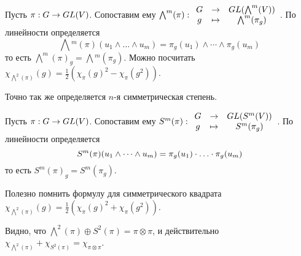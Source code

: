 {    Пусть $\pi: G \map GL(V)$. Сопоставим ему $\bigwedge^m(\pi): \arr{ccc}{G&\map&GL(\bigwedge^m(V))\\g&\mapsto&\bigwedge^m(\pi_g)}$.
    По линейности определяется \[\bigwedge\!\!{}^m(\pi)(u_1 \wedge \dots \wedge u_m) = \pi_g(u_1) \wedge \cdots \wedge \pi_g(u_m)\]
    то есть $\bigwedge^m(\pi)_g = \bigwedge\!\!{}^m(\pi_g)$.
    Можно посчитать $\chi_{\bigwedge^2(\pi)}(g) = \frac{1}{2}(\chi_\pi(g)^2 - \chi_\pi(g^2))$.
    \item Точно так же определяется $n$-я симметрическая степень.

    Пусть $\pi: G \map GL(V)$. Сопоставим ему $S^m(\pi): \arr{ccc}{G&\map&GL(S^m(V))\\g&\mapsto&S^m(\pi_g)}$.
    По линейности определяется \[S^m(\pi)(u_1 \wedge \dots \wedge u_m) = \pi_g(u_1) \proddots \pi_g(u_m)\]
    то есть $S^m(\pi)_g = S^m(\pi_g)$.

    Полезно помнить формулу для симметрического квадрата $\chi_{\bigwedge^2(\pi)}(g) = \frac{1}{2}(\chi_\pi(g)^2 + \chi_\pi(g^2))$.

    Видно, что $\bigwedge^2(\pi)\oplus S^2(\pi) = \pi \otimes \pi$, и действительно $\chi_{\bigwedge^2(\pi)} + \chi_{S^2(\pi)} = \chi_{\pi \otimes \pi}$.

}


